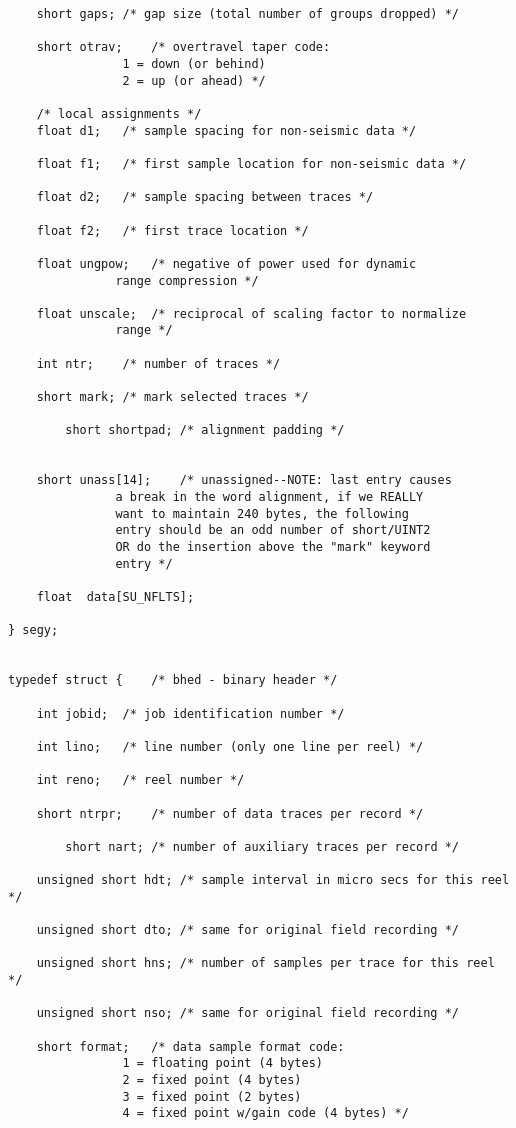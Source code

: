 {\begin{verbatim}
	short gaps;	/* gap size (total number of groups dropped) */

	short otrav;	/* overtravel taper code:
				1 = down (or behind)
				2 = up (or ahead) */

	/* local assignments */
	float d1;	/* sample spacing for non-seismic data */

	float f1;	/* first sample location for non-seismic data */

	float d2;	/* sample spacing between traces */

	float f2;	/* first trace location */

	float ungpow;	/* negative of power used for dynamic
			   range compression */

	float unscale;	/* reciprocal of scaling factor to normalize
			   range */

	int ntr; 	/* number of traces */

	short mark;	/* mark selected traces */

        short shortpad; /* alignment padding */


	short unass[14];	/* unassigned--NOTE: last entry causes 
			   a break in the word alignment, if we REALLY
			   want to maintain 240 bytes, the following
			   entry should be an odd number of short/UINT2
			   OR do the insertion above the "mark" keyword
			   entry */

	float  data[SU_NFLTS];

} segy;


typedef struct {	/* bhed - binary header */

	int jobid;	/* job identification number */

	int lino;	/* line number (only one line per reel) */

	int reno;	/* reel number */

	short ntrpr;	/* number of data traces per record */

        short nart;	/* number of auxiliary traces per record */

	unsigned short hdt; /* sample interval in micro secs for this reel */

	unsigned short dto; /* same for original field recording */

	unsigned short hns; /* number of samples per trace for this reel */

	unsigned short nso; /* same for original field recording */

	short format;	/* data sample format code:
				1 = floating point (4 bytes)
				2 = fixed point (4 bytes)
				3 = fixed point (2 bytes)
				4 = fixed point w/gain code (4 bytes) */


\end{verbatim}}
